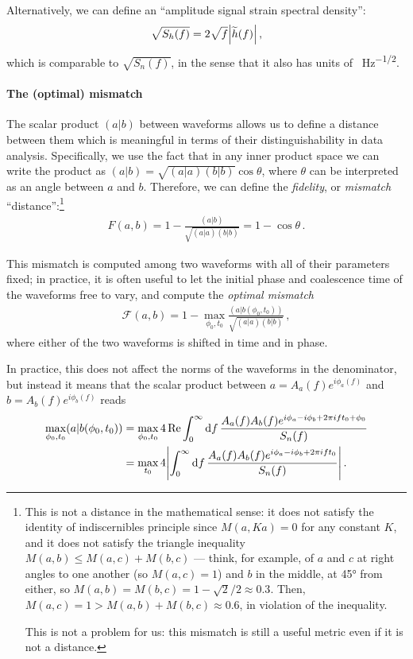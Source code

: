 \documentclass[main.tex]{subfiles}
\begin{document}
Alternatively, we can define an ``amplitude signal strain spectral density'': 
%
\begin{align}
\sqrt{S_h (f)} = 2 \sqrt{f} \abs{\widetilde{h}(f)}
\,,
\end{align}
%
which is comparable to \(\sqrt{S_n(f)}\), in the sense that it also has units of \SI{}{Hz^{-1/2}}.

\paragraph{The (optimal) mismatch}

The scalar product \((a|b)\) between waveforms allows us to define a distance between them which is meaningful in terms of their distinguishability in data analysis.
Specifically, we use the fact that in any inner product space we can write the product as \((a|b) = \sqrt{(a|a) (b|b)} \cos \theta \), where \(\theta \) can be interpreted as an angle between \(a\) and \(b\). 
Therefore, we can define the \emph{fidelity}, or \emph{mismatch} ``distance'':\footnote{This is not a distance in the mathematical sense: it does not satisfy the identity of indiscernibles principle since \(M(a, Ka) = 0\) for any constant \(K\), and it does not satisfy the triangle inequality \(M(a, b) \leq M(a, c) + M(b, c)\) --- think, for example, of \(a\) and \(c\) at right angles to one another (so \(M(a, c) = 1\)) and \(b\) in the middle, at 45° from either, so \(M(a, b) = M(b, c) = 1 - \sqrt{2} / 2 \approx 0.3\). Then, \(M(a,c) = 1 > M(a, b) + M(b, c) \approx 0.6\), in violation of the inequality. 

This is not a problem for us: this mismatch is still a useful metric even if it is not a distance. }
%
\begin{align}
F(a, b) = 1 - \frac{(a|b)}{\sqrt{(a|a) (b|b)}} = 1 - \cos \theta 
\,.
\end{align}

This mismatch is computed among two waveforms with all of their parameters fixed; in practice, it is often useful to let the initial phase and coalescence time of the waveforms free to vary, and compute the \emph{optimal mismatch}
%
\begin{align}
\mathcal{F}(a, b) = 1 - \max_{\phi_0 , t_0 } \frac{(a|b(\phi_0, t_0 ))}{\sqrt{(a|a)(b|b)}}
\,,
\end{align}
%
where either of the two waveforms is shifted in time and in phase.

In practice, this does not affect the norms of the waveforms in the denominator, but instead it means that the scalar product between \(a = A_a(f) e^{i \phi _a (f)}\) and \(b = A_b (f) e^{i \phi _b (f)}\) reads 
%
\begin{align}
\max_{\phi_0 , t_0 } (a|b(\phi_0 , t_0 )) 
&= \max_{\phi_0, t_0 } 4 \Re \int_{0}^{\infty } \dd{f} \frac{A_a (f) A_b(f) e^{i \phi_a - i \phi _b + 2 \pi i f t_0 + \phi_0 }}{S_n (f)} \\
&= \max_{t_0 } 4 \abs{\int_{0}^{\infty } \dd{f} \frac{A_a (f) A_b(f) e^{i \phi_a - i \phi _b + 2 \pi i f t_0 }}{S_n (f)}}
\,.
\end{align}
\end{document}
